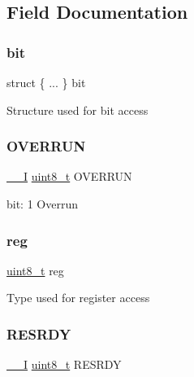 \subsection{Field Documentation}
\mbox{\label{union_a_d_c___i_n_t_f_l_a_g___type_aaafaee0f01a6be5d0f6f5da331c065ca}} 
\subsubsection{\texorpdfstring{bit}{bit}}
{\footnotesize\ttfamily struct \{ ... \}   bit}

Structure used for bit access \mbox{\label{union_a_d_c___i_n_t_f_l_a_g___type_a45fbafb248fda764e17929e95d11b4e6}} 
\subsubsection{\texorpdfstring{OVERRUN}{OVERRUN}}
{\footnotesize\ttfamily \mbox{\hyperlink{core__cm0plus_8h_af63697ed9952cc71e1225efe205f6cd3}{\+\_\+\+\_\+I}} \mbox{\hyperlink{union_a_d_c___i_n_t_f_l_a_g___type_a5b4208c6f4c4a4290c4f2804d1eb1d5b}{uint8\+\_\+t}} O\+V\+E\+R\+R\+UN}

bit\+: 1 Overrun \mbox{\label{union_a_d_c___i_n_t_f_l_a_g___type_a9428adc9af4653a2050e2536b55dec8d}} 
\subsubsection{\texorpdfstring{reg}{reg}}
{\footnotesize\ttfamily \mbox{\hyperlink{union_a_d_c___i_n_t_f_l_a_g___type_a5b4208c6f4c4a4290c4f2804d1eb1d5b}{uint8\+\_\+t}} reg}

Type used for register access \mbox{\label{union_a_d_c___i_n_t_f_l_a_g___type_a9ec027487d3721be7f9ba572b68ef298}} 
\subsubsection{\texorpdfstring{RESRDY}{RESRDY}}
{\footnotesize\ttfamily \mbox{\hyperlink{core__cm0plus_8h_af63697ed9952cc71e1225efe205f6cd3}{\+\_\+\+\_\+I}} \mbox{\hyperlink{union_a_d_c___i_n_t_f_l_a_g___type_a5b4208c6f4c4a4290c4f2804d1eb1d5b}{uint8\+\_\+t}} R\+E\+S\+R\+DY}

